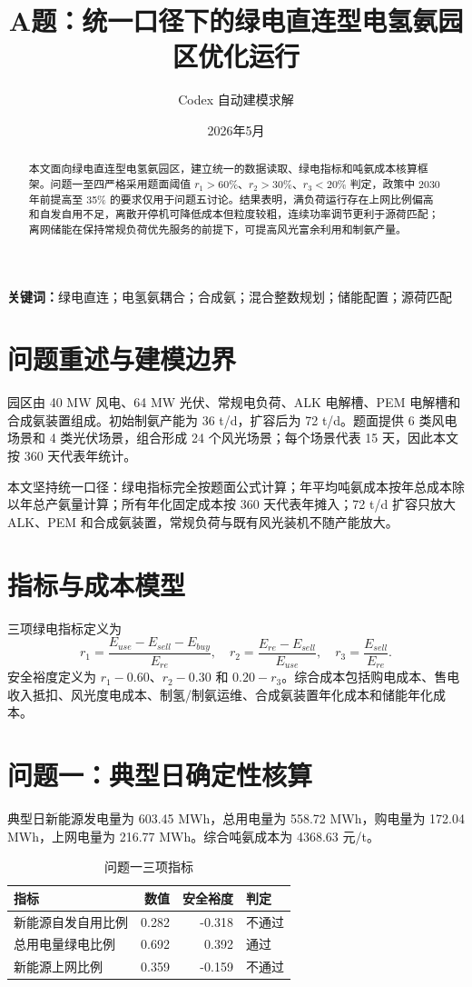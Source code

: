 \documentclass[12pt]{article}
\title{A题：统一口径下的绿电直连型电氢氨园区优化运行}
\author{Codex 自动建模求解}
\date{2026年5月}
\begin{document}
\maketitle

\begin{abstract}
本文面向绿电直连型电氢氨园区，建立统一的数据读取、绿电指标和吨氨成本核算框架。问题一至四严格采用题面阈值 $r_1>60\%$、$r_2>30\%$、$r_3<20\%$ 判定，政策中 2030 年前提高至 35\% 的要求仅用于问题五讨论。结果表明，满负荷运行存在上网比例偏高和自发自用不足，离散开停机可降低成本但粒度较粗，连续功率调节更利于源荷匹配；离网储能在保持常规负荷优先服务的前提下，可提高风光富余利用和制氨产量。
\end{abstract}

\noindent\textbf{关键词：}绿电直连；电氢氨耦合；合成氨；混合整数规划；储能配置；源荷匹配

\section{问题重述与建模边界}
园区由 40 MW 风电、64 MW 光伏、常规电负荷、ALK 电解槽、PEM 电解槽和合成氨装置组成。初始制氨产能为 36 t/d，扩容后为 72 t/d。题面提供 6 类风电场景和 4 类光伏场景，组合形成 24 个风光场景；每个场景代表 15 天，因此本文按 360 天代表年统计。

本文坚持统一口径：绿电指标完全按题面公式计算；年平均吨氨成本按年总成本除以年总产氨量计算；所有年化固定成本按 360 天代表年摊入；72 t/d 扩容只放大 ALK、PEM 和合成氨装置，常规负荷与既有风光装机不随产能放大。

\section{指标与成本模型}
三项绿电指标定义为
\[
r_1=\frac{E_{use}-E_{sell}-E_{buy}}{E_{re}},\quad
r_2=\frac{E_{re}-E_{sell}}{E_{use}},\quad
r_3=\frac{E_{sell}}{E_{re}}.
\]
安全裕度定义为 $r_1-0.60$、$r_2-0.30$ 和 $0.20-r_3$。综合成本包括购电成本、售电收入抵扣、风光度电成本、制氢/制氨运维、合成氨装置年化成本和储能年化成本。

\section{问题一：典型日确定性核算}
典型日新能源发电量为 603.45 MWh，总用电量为 558.72 MWh，购电量为 172.04 MWh，上网电量为 216.77 MWh。综合吨氨成本为 4368.63 元/t。

\begin{table}[htbp]\centering
\caption{问题一三项指标}
\begin{tabular}{lrrl}\toprule
指标 & 数值 & 安全裕度 & 判定 \\\midrule
新能源自发自用比例 & 0.282 & -0.318 & 不通过 \\
总用电量绿电比例 & 0.692 & 0.392 & 通过 \\
新能源上网比例 & 0.359 & -0.159 & 不通过 \\
\bottomrule
\end{tabular}
\end{table}
\end{document}
